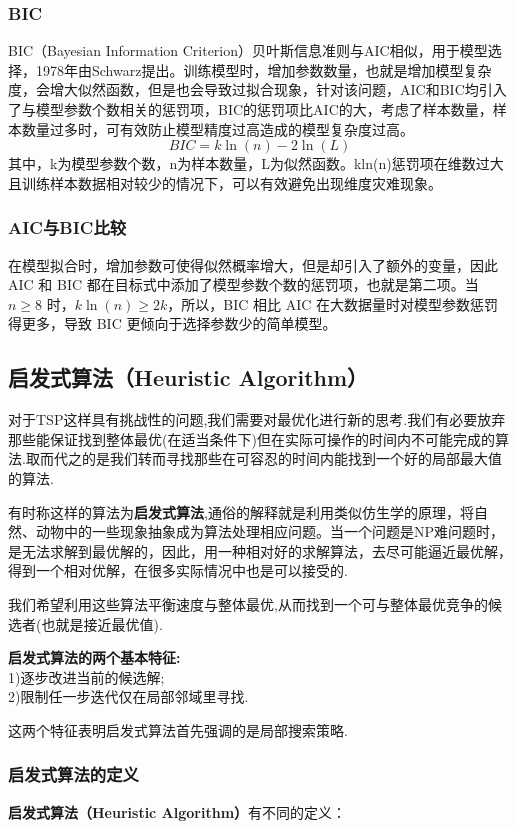 \documentclass[11pt,a4paper,oneside]{book}
\begin{document}
\subsubsection{BIC}
BIC（Bayesian Information Criterion）贝叶斯信息准则与AIC相似，用于模型选择，1978年由Schwarz提出。训练模型时，增加参数数量，也就是增加模型复杂度，会增大似然函数，但是也会导致过拟合现象，针对该问题，AIC和BIC均引入了与模型参数个数相关的惩罚项，BIC的惩罚项比AIC的大，考虑了样本数量，样本数量过多时，可有效防止模型精度过高造成的模型复杂度过高。
\begin{equation}
	BIC=k\ln(n)-2\ln(L)
\end{equation}
其中，k为模型参数个数，n为样本数量，L为似然函数。kln(n)惩罚项在维数过大且训练样本数据相对较少的情况下，可以有效避免出现维度灾难现象。

\subsubsection{AIC与BIC比较}
在模型拟合时，增加参数可使得似然概率增大，但是却引入了额外的变量，因此 AIC 和 BIC 都在目标式中添加了模型参数个数的惩罚项，也就是第二项。当 $ n\geq 8 $ 时，$ k\ln(n)\geq 2k $，所以，BIC 相比 AIC 在大数据量时对模型参数惩罚得更多，导致 BIC 更倾向于选择参数少的简单模型。

\subsection{启发式算法（Heuristic Algorithm）}
对于TSP这样具有挑战性的问题,我们需要对最优化进行新的思考.我们有必要放弃那些能保证找到整体最优(在适当条件下)但在实际可操作的时间内不可能完成的算法.取而代之的是我们转而寻找那些在可容忍的时间内能找到一个好的局部最大值的算法.

有时称这样的算法为\textbf{启发式算法},通俗的解释就是利用类似仿生学的原理，将自然、动物中的一些现象抽象成为算法处理相应问题。当一个问题是NP难问题时，是无法求解到最优解的，因此，用一种相对好的求解算法，去尽可能逼近最优解，得到一个相对优解，在很多实际情况中也是可以接受的.

我们希望利用这些算法平衡速度与整体最优,从而找到一个可与整体最优竞争的候选者(也就是接近最优值).

\textbf{启发式算法的两个基本特征:}\\
1)逐步改进当前的候选解;\\
2)限制任一步迭代仅在局部邻域里寻找.

这两个特征表明启发式算法首先强调的是局部搜索策略.

\subsubsection{启发式算法的定义}
\textbf{启发式算法（Heuristic Algorithm）}有不同的定义：
\end{document}
